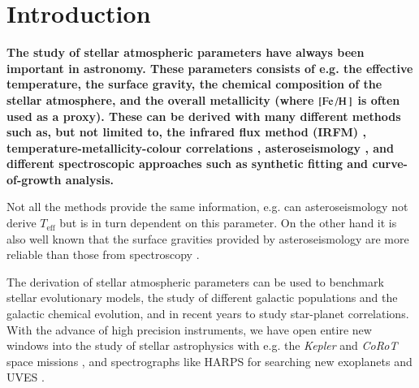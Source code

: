 \documentclass{aa}
\begin{document}
\maketitle



\section{Introduction}
\label{sec:introduction}

{\bf
The study of stellar atmospheric parameters have always been important in astronomy. These
parameters consists of e.g. the effective temperature, the surface gravity, the chemical composition
of the stellar atmosphere, and the overall metallicity (where $[\ion{Fe}/\ion{H}]$ is often used as
a proxy). These can be derived with many different methods such as, but not limited to, the infrared
flux method (IRFM) \citep{Blackwell1977}, temperature-metallicity-colour correlations \citep[see
e.g.][]{Ramirez2005b}, asteroseismology \citep[see][for a classic example]{Kjeldsen1995}, and
different spectroscopic approaches such as synthetic fitting \citep[see
e.g.][]{Onehag2012,Tsantaki2017} and curve-of-growth analysis.

Not all the methods provide the same information, e.g. can asteroseismology not derive
$T_\mathrm{eff}$ but is in turn dependent on this parameter. On the other hand it is also well known
that the surface gravities provided by asteroseismology are more reliable than those from
spectroscopy \citep[see e.g. the discussion by][]{Mortier2014}.

The derivation of stellar atmospheric parameters can be used to benchmark stellar evolutionary
models, the study of different galactic populations and the galactic chemical evolution, and in
recent years to study star-planet correlations. With the advance of high precision instruments, we
have open entire new windows into the study of stellar astrophysics with e.g. the \emph{Kepler} and
\emph{CoRoT} space missions \citep[see e.g.][]{Christensen-Dalsgaard2010,Chaplin2011,Huber2014}, and
spectrographs like HARPS for searching new exoplanets \citep{HARPS} and UVES \citep{UVES}.

}
\end{document}
